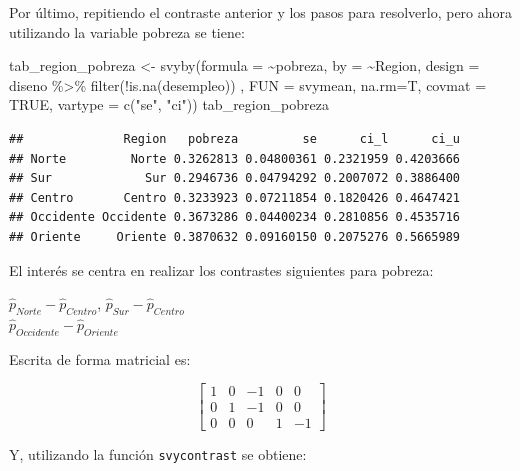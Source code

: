 \documentclass[
  12pt,
]{book}
\newenvironment{Shaded}{\begin{snugshade}}{\end{snugshade}}
\newcommand{\AttributeTok}[1]{\textcolor[rgb]{0.77,0.63,0.00}{#1}}
\newcommand{\ConstantTok}[1]{\textcolor[rgb]{0.00,0.00,0.00}{#1}}
\newcommand{\FunctionTok}[1]{\textcolor[rgb]{0.00,0.00,0.00}{#1}}
\newcommand{\NormalTok}[1]{#1}
\newcommand{\OtherTok}[1]{\textcolor[rgb]{0.56,0.35,0.01}{#1}}
\newcommand{\SpecialCharTok}[1]{\textcolor[rgb]{0.00,0.00,0.00}{#1}}
\newcommand{\StringTok}[1]{\textcolor[rgb]{0.31,0.60,0.02}{#1}}
\begin{document}
Por último, repitiendo el contraste anterior y los pasos para resolverlo, pero ahora utilizando la variable pobreza se tiene:

\begin{Shaded}
\begin{Highlighting}[]
\NormalTok{tab\_region\_pobreza }\OtherTok{\textless{}{-}} \FunctionTok{svyby}\NormalTok{(}\AttributeTok{formula =} \SpecialCharTok{\textasciitilde{}}\NormalTok{pobreza, }\AttributeTok{by =} \SpecialCharTok{\textasciitilde{}}\NormalTok{Region, }
                            \AttributeTok{design =}\NormalTok{ diseno }\SpecialCharTok{\%\textgreater{}\%} \FunctionTok{filter}\NormalTok{(}\SpecialCharTok{!}\FunctionTok{is.na}\NormalTok{(desempleo)) , }
                            \AttributeTok{FUN =}\NormalTok{ svymean, }\AttributeTok{na.rm=}\NormalTok{T, }\AttributeTok{covmat =} \ConstantTok{TRUE}\NormalTok{,}
                            \AttributeTok{vartype =} \FunctionTok{c}\NormalTok{(}\StringTok{"se"}\NormalTok{, }\StringTok{"ci"}\NormalTok{))}
\NormalTok{tab\_region\_pobreza}
\end{Highlighting}
\end{Shaded}

\begin{verbatim}
##              Region   pobreza         se      ci_l      ci_u
## Norte         Norte 0.3262813 0.04800361 0.2321959 0.4203666
## Sur             Sur 0.2946736 0.04794292 0.2007072 0.3886400
## Centro       Centro 0.3233923 0.07211854 0.1820426 0.4647421
## Occidente Occidente 0.3673286 0.04400234 0.2810856 0.4535716
## Oriente     Oriente 0.3870632 0.09160150 0.2075276 0.5665989
\end{verbatim}

El interés se centra en realizar los contrastes siguientes para pobreza:

\(\hat{p}_{Norte} - \hat{p}_{Centro}\),
\(\hat{p}_{Sur}-\hat{p}_{Centro}\)\\
\(\hat{p}_{Occidente}-\hat{p}_{Oriente}\)

Escrita de forma matricial es:

\[
\left[\begin{array}{ccccc}
1 & 0 & -1 & 0 & 0\\
0 & 1 & -1 & 0 & 0\\
0 & 0 & 0 & 1 & -1
\end{array}\right]
\]

Y, utilizando la función \texttt{svycontrast} se obtiene:
\end{document}
